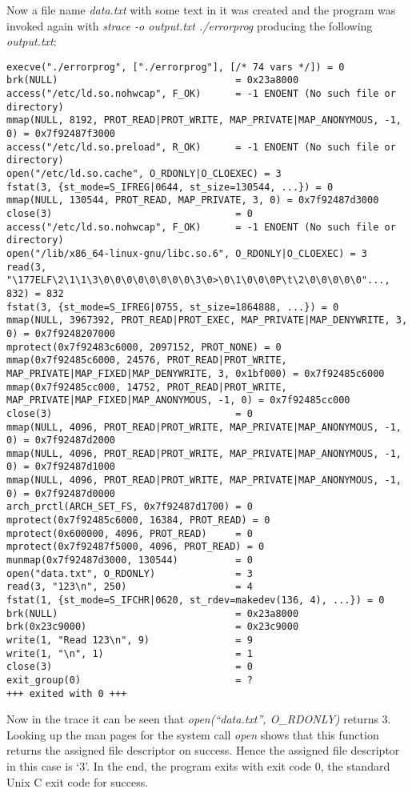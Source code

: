 \documentclass[a4paper,11pt,twoside]{article}
\begin{document}
Now a file name \textit{data.txt} with some text in it was created and the program was invoked again with \textit{strace -o output.txt ./errorprog} producing the following \textit{output.txt}:

\begin{verbatim}
execve("./errorprog", ["./errorprog"], [/* 74 vars */]) = 0
brk(NULL)                               = 0x23a8000
access("/etc/ld.so.nohwcap", F_OK)      = -1 ENOENT (No such file or directory)
mmap(NULL, 8192, PROT_READ|PROT_WRITE, MAP_PRIVATE|MAP_ANONYMOUS, -1, 0) = 0x7f92487f3000
access("/etc/ld.so.preload", R_OK)      = -1 ENOENT (No such file or directory)
open("/etc/ld.so.cache", O_RDONLY|O_CLOEXEC) = 3
fstat(3, {st_mode=S_IFREG|0644, st_size=130544, ...}) = 0
mmap(NULL, 130544, PROT_READ, MAP_PRIVATE, 3, 0) = 0x7f92487d3000
close(3)                                = 0
access("/etc/ld.so.nohwcap", F_OK)      = -1 ENOENT (No such file or directory)
open("/lib/x86_64-linux-gnu/libc.so.6", O_RDONLY|O_CLOEXEC) = 3
read(3, "\177ELF\2\1\1\3\0\0\0\0\0\0\0\0\3\0>\0\1\0\0\0P\t\2\0\0\0\0\0"..., 832) = 832
fstat(3, {st_mode=S_IFREG|0755, st_size=1864888, ...}) = 0
mmap(NULL, 3967392, PROT_READ|PROT_EXEC, MAP_PRIVATE|MAP_DENYWRITE, 3, 0) = 0x7f9248207000
mprotect(0x7f92483c6000, 2097152, PROT_NONE) = 0
mmap(0x7f92485c6000, 24576, PROT_READ|PROT_WRITE, MAP_PRIVATE|MAP_FIXED|MAP_DENYWRITE, 3, 0x1bf000) = 0x7f92485c6000
mmap(0x7f92485cc000, 14752, PROT_READ|PROT_WRITE, MAP_PRIVATE|MAP_FIXED|MAP_ANONYMOUS, -1, 0) = 0x7f92485cc000
close(3)                                = 0
mmap(NULL, 4096, PROT_READ|PROT_WRITE, MAP_PRIVATE|MAP_ANONYMOUS, -1, 0) = 0x7f92487d2000
mmap(NULL, 4096, PROT_READ|PROT_WRITE, MAP_PRIVATE|MAP_ANONYMOUS, -1, 0) = 0x7f92487d1000
mmap(NULL, 4096, PROT_READ|PROT_WRITE, MAP_PRIVATE|MAP_ANONYMOUS, -1, 0) = 0x7f92487d0000
arch_prctl(ARCH_SET_FS, 0x7f92487d1700) = 0
mprotect(0x7f92485c6000, 16384, PROT_READ) = 0
mprotect(0x600000, 4096, PROT_READ)     = 0
mprotect(0x7f92487f5000, 4096, PROT_READ) = 0
munmap(0x7f92487d3000, 130544)          = 0
open("data.txt", O_RDONLY)              = 3
read(3, "123\n", 250)                   = 4
fstat(1, {st_mode=S_IFCHR|0620, st_rdev=makedev(136, 4), ...}) = 0
brk(NULL)                               = 0x23a8000
brk(0x23c9000)                          = 0x23c9000
write(1, "Read 123\n", 9)               = 9
write(1, "\n", 1)                       = 1
close(3)                                = 0
exit_group(0)                           = ?
+++ exited with 0 +++

\end{verbatim}

Now in the trace it can be seen that \textit{open(``data.txt'', O\_RDONLY)} returns 3. Looking up the man pages for the system call \textit{open} shows that this function returns the assigned file descriptor on success. Hence the assigned file descriptor in this case is `3'. In the end, the program exits with exit code 0, the standard Unix C exit code for success.


\end{document}
